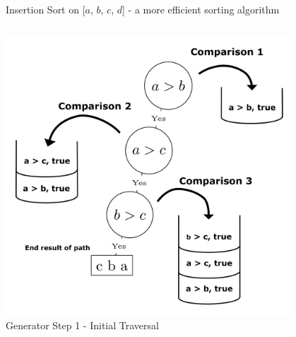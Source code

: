 \documentclass[final]{beamer}
\newlength{\onecolwid}
\newlength{\twocolwid}
\newlength{\onecolwidmid}
\begin{document}
\begin{frame}[t]
\begin{columns}[t]
\begin{column}{\twocolwid}
\begin{figure}
\resizebox{0.9\linewidth}{!}{}
\caption{Insertion Sort on [$a$, $b$, $c$, $d$] - a more efficient sorting algorithm}
\end{figure}


\begin{columns}[c,totalwidth=\twocolwid] %

\begin{column}{\onecolwidmid} %


\begin{figure}
\includegraphics[width=0.8\linewidth]{figures/bubble_sort_step_1_formatted.png}
\caption{Generator Step 1 - Initial Traversal}
\label{generator:1}
\end{figure}


\end{column} %

\begin{column}{\onecolwidmid} %


\end{column}
\end{columns}
\end{column}
\end{columns}
\end{frame}
\end{document}
